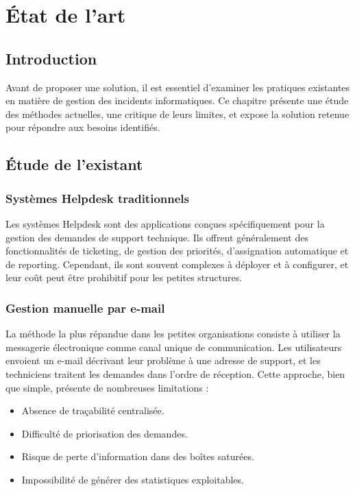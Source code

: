 \documentclass[12pt,a4paper,oneside]{report}
\begin{document}
\chapter{État de l'art}

\section{Introduction}

Avant de proposer une solution, il est essentiel d'examiner les pratiques existantes en matière de gestion des incidents informatiques. Ce chapitre présente une étude des méthodes actuelles, une critique de leurs limites, et expose la solution retenue pour répondre aux besoins identifiés.

\section{Étude de l'existant}

\subsection{Systèmes Helpdesk traditionnels}

Les systèmes Helpdesk sont des applications conçues spécifiquement pour la gestion des demandes de support technique. Ils offrent généralement des fonctionnalités de ticketing, de gestion des priorités, d'assignation automatique et de reporting. Cependant, ils sont souvent complexes à déployer et à configurer, et leur coût peut être prohibitif pour les petites structures.

\subsection{Gestion manuelle par e-mail}

La méthode la plus répandue dans les petites organisations consiste à utiliser la messagerie électronique comme canal unique de communication. Les utilisateurs envoient un e-mail décrivant leur problème à une adresse de support, et les techniciens traitent les demandes dans l'ordre de réception. Cette approche, bien que simple, présente de nombreuses limitations :
\begin{itemize}
    \item Absence de traçabilité centralisée.
    \item Difficulté de priorisation des demandes.
    \item Risque de perte d'information dans des boîtes saturées.
    \item Impossibilité de générer des statistiques exploitables.
\end{itemize}
\end{document}

